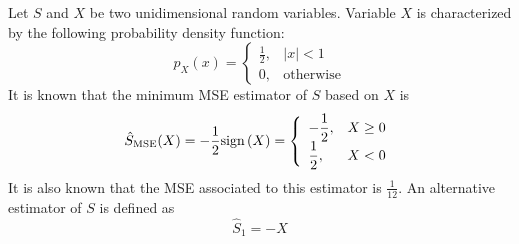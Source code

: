 \else

\question Let $S$ and $X$ be two unidimensional random variables. Variable $X$ is characterized by the following probability density function:
$$p_X(x) = \left\{\begin{array}{ll}
					\frac{1}{2}, & |x|<1 \\
	  				0, & {\mbox{otherwise}} 
	 			 \end{array} 
		   \right. $$   
It is known that the minimum MSE estimator of $S$ based on $X$ is
$$\hat{S}_\text{MSE}(X)= - \frac{1}{2} \mbox{sign}\left(X \right)   =  \left\{\begin{array}{ll}
						  	\displaystyle
								 - \frac{1}{2}, & X \geq 0 \\
	  							 \displaystyle\frac{1}{2}, & X< 0
	 					 \end{array} 
						  \right. $$   
It is also known that the MSE associated to this estimator is $\displaystyle\frac{1}{12}$. An alternative estimator of $S$ is defined as $$\hat{S}_1=-X$$

\begin{solution}
\end{solution}

\fi